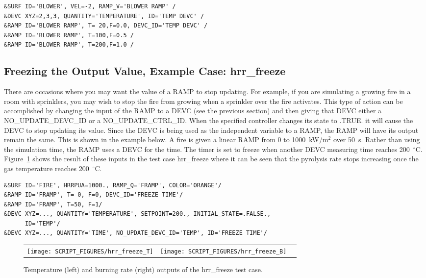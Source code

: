 \documentclass[11pt]{book}
\begin{document}
\begin{lstlisting}
&SURF ID='BLOWER', VEL=-2, RAMP_V='BLOWER RAMP' /
&DEVC XYZ=2,3,3, QUANTITY='TEMPERATURE', ID='TEMP DEVC' /
&RAMP ID='BLOWER RAMP', T= 20,F=0.0, DEVC_ID='TEMP DEVC' /
&RAMP ID='BLOWER RAMP', T=100,F=0.5 /
&RAMP ID='BLOWER RAMP', T=200,F=1.0 /
\end{lstlisting}

\subsection{Freezing the Output Value, Example Case: hrr\_freeze}
\label{info:freeze_device}

There are occasions where you may want the value of a {\ct RAMP} to stop updating.  For example, if you are simulating a growing fire in a room with sprinklers, you may wish to stop the fire from growing when a sprinkler over the fire activates.  This type of action can be accomplished by changing the input of the {\ct RAMP} to a {\ct DEVC} (see the previous section) and then giving that {\ct DEVC} either a {\ct NO\_UPDATE\_DEVC\_ID} or a {\ct NO\_UPDATE\_CTRL\_ID}.  When the specified controller changes its state to {\ct .TRUE.} it will cause the {\ct DEVC} to stop updating its value.  Since the {\ct DEVC} is being used as the independent variable to a {\ct RAMP}, the {\ct RAMP} will have its output remain the same.  This is shown in the example below.  A fire is given a linear {\ct RAMP} from 0 to 1000~kW/m$^2$ over 50~s. Rather than using the simulation time, the {\ct RAMP} uses a {\ct DEVC} for the time.  The timer is set to freeze when another {\ct DEVC} measuring time reaches 200~$^\circ$C.  Figure~\ref{freeze_hrr} shows the result of these inputs in the test case {\ct hrr\_freeze} where it can be seen that the pyrolysis rate stops increasing once the gas temperature reaches 200~$^\circ$C.
\begin{lstlisting}
&SURF ID='FIRE', HRRPUA=1000., RAMP_Q='FRAMP', COLOR='ORANGE'/
&RAMP ID='FRAMP', T= 0, F=0, DEVC_ID='FREEZE TIME'/
&RAMP ID='FRAMP', T=50, F=1/
&DEVC XYZ=..., QUANTITY='TEMPERATURE', SETPOINT=200., INITIAL_STATE=.FALSE.,
      ID='TEMP'/
&DEVC XYZ=..., QUANTITY='TIME', NO_UPDATE_DEVC_ID='TEMP', ID='FREEZE TIME'/
\end{lstlisting}

\begin{figure}[ht]
\begin{tabular*}{\textwidth}{lll}
\texttt{[image: SCRIPT\_FIGURES/hrr\_freeze\_T]} &
\texttt{[image: SCRIPT\_FIGURES/hrr\_freeze\_B]} &
\end{tabular*}
\caption[Example of freezing the output of a {\ct RAMP}]{Temperature (left) and burning rate (right) outputs of the {\ct hrr\_freeze} test case.}
\label{freeze_hrr}
\end{figure}
\end{document}
